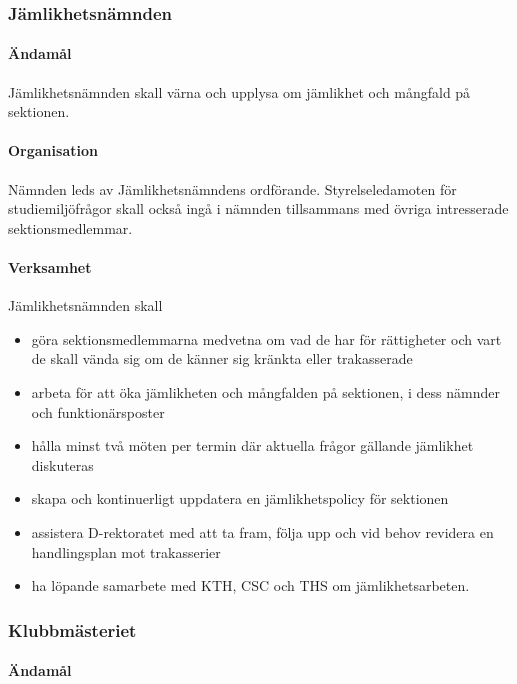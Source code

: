 \documentclass[a4paper,12pt]{article}
\begin{document}
\subsubsection{Jämlikhetsnämnden}

\paragraph{Ändamål}

Jämlikhetsnämnden skall värna och upplysa om jämlikhet och mångfald på sektionen.

\paragraph{Organisation}

Nämnden leds av Jämlikhetsnämndens ordförande. Styrelseledamoten för studiemiljöfrågor skall också ingå i nämnden tillsammans med övriga intresserade sektionsmedlemmar.

\paragraph{Verksamhet}

Jämlikhetsnämnden skall

\begin{itemize}
  \item göra sektionsmedlemmarna medvetna om vad de har för rättigheter och vart de skall vända sig om de känner sig kränkta eller trakasserade
  \item arbeta för att öka jämlikheten och mångfalden på sektionen, i dess nämnder och funktionärsposter
  \item hålla minst två möten per termin där aktuella frågor gällande jämlikhet diskuteras
  \item skapa och kontinuerligt uppdatera en jämlikhetspolicy för sektionen
  \item assistera D-rektoratet med att ta fram, följa upp och vid behov revidera en handlingsplan mot trakasserier
  \item ha löpande samarbete med KTH, CSC och THS om jämlikhetsarbeten.
\end{itemize}

\subsubsection{Klubbmästeriet}

\paragraph{Ändamål}
\end{document}
